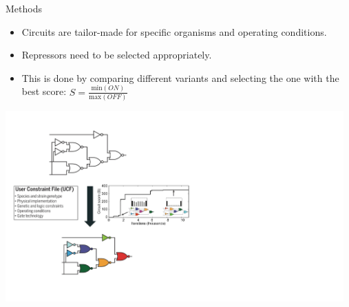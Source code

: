 \documentclass[10pt]{beamer}
\begin{document}
\begin{frame}{Methods}
    \begin{minipage}{.4\textwidth}
        \centering
        \begin{itemize}
            \item Circuits are tailor-made for specific organisms and operating conditions. 
            \item Repressors need to be selected appropriately. \item This is done by comparing different variants and selecting the one with the best score: $S = \frac{\text{min}(ON)}{\text{max}(OFF)}$
        \end{itemize}
    \end{minipage}%
    \begin{minipage}{.6\textwidth}
        \centering
        \includegraphics[width=13cm]{overview2.jpg}
    \end{minipage}

\end{frame}
\end{document}
